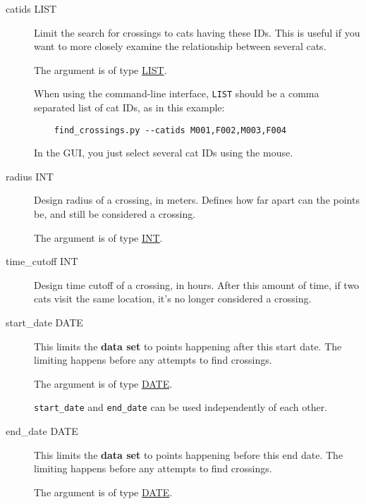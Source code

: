 \begin{description}

\item[catids LIST]
\hypertarget{crossing-catids}{}

Limit the search for crossings to cats having these IDs. This is useful
if you want to more closely examine the relationship between several
cats.

The argument is of type \hyperlink{argument-type-int}{LIST}.

When using the command-line interface, \texttt{LIST} should be a comma
separated list of cat IDs, as in this example:

\begin{verbatim}
    find_crossings.py --catids M001,F002,M003,F004
\end{verbatim}

In the GUI, you just select several cat IDs using the mouse.

\item[radius INT]
\hypertarget{crossing-radius}{}

Design radius of a crossing, in meters. Defines how far apart can the
points be, and still be considered a crossing.

The argument is of type \hyperlink{argument-type-int}{INT}.

\item[time\_cutoff INT]
\hypertarget{crossing-time-cutoff}{}

Design time cutoff of a crossing, in hours. After this amount of time,
if two cats visit the same location, it's no longer considered a
crossing.

\item[start\_date DATE]
\hypertarget{crossing-start-date}{}

This limits the \textbf{data set} to points happening after this start
date. The limiting happens before any attempts to find crossings.

The argument is of type \hyperlink{argument-type-date}{DATE}.

\texttt{start\_date} and \texttt{end\_date} can be used independently of
each other.

\item[end\_date DATE]
\hypertarget{crossing-end-date}{}

This limits the \textbf{data set} to points happening before this end
date. The limiting happens before any attempts to find crossings.

The argument is of type \hyperlink{argument-type-date}{DATE}.


\end{description}
